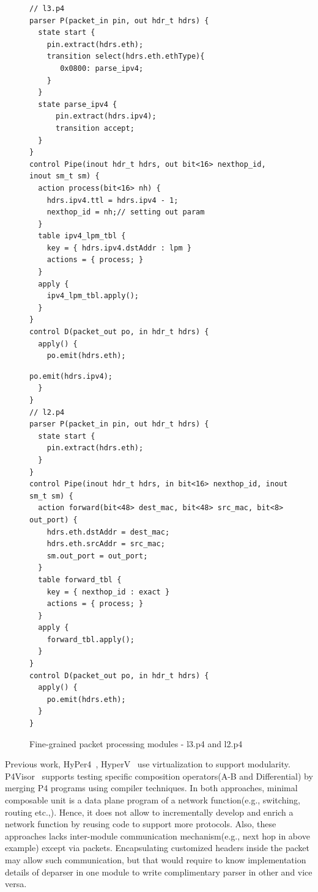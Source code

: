 \documentclass[10pt,sigconf,letterpaper,anonymous]{acmart}
\begin{document}
\begin{figure}
\noindent \begin{minipage}[t]{.48\textwidth}
\begin{lstlisting}[frame=none]
// l3.p4
parser P(packet_in pin, out hdr_t hdrs) {
  state start {
    pin.extract(hdrs.eth);
    transition select(hdrs.eth.ethType){
       0x0800: parse_ipv4;
    }
  }
  state parse_ipv4 {
      pin.extract(hdrs.ipv4);
      transition accept;
  }
}
control Pipe(inout hdr_t hdrs, out bit<16> nexthop_id, inout sm_t sm) {
  action process(bit<16> nh) {
    hdrs.ipv4.ttl = hdrs.ipv4 - 1;
    nexthop_id = nh;// setting out param
  }
  table ipv4_lpm_tbl {
    key = { hdrs.ipv4.dstAddr : lpm } 
    actions = { process; }
  }
  apply {
    ipv4_lpm_tbl.apply();
  }
}
control D(packet_out po, in hdr_t hdrs) {
  apply() {
    po.emit(hdrs.eth);
\end{lstlisting}
\end{minipage}
\hfill\begin{minipage}[t]{.48\textwidth}
\begin{lstlisting}[frame=none]
    po.emit(hdrs.ipv4);
  }
}
// l2.p4
parser P(packet_in pin, out hdr_t hdrs) {
  state start {
    pin.extract(hdrs.eth);
  }
}
control Pipe(inout hdr_t hdrs, in bit<16> nexthop_id, inout sm_t sm) {
  action forward(bit<48> dest_mac, bit<48> src_mac, bit<8> out_port) {
    hdrs.eth.dstAddr = dest_mac;
    hdrs.eth.srcAddr = src_mac;
    sm.out_port = out_port;    
  }
  table forward_tbl {
    key = { nexthop_id : exact } 
    actions = { process; }
  }
  apply {
    forward_tbl.apply();
  }
}
control D(packet_out po, in hdr_t hdrs) {
  apply() {
    po.emit(hdrs.eth);
  }
}
\end{lstlisting}
\end{minipage}
\vspace*{-10pt}
\caption{Fine-grained packet processing modules - l3.p4  and l2.p4}
\label{fig:l3.p4.l2.p4}
\end{figure}


Previous work, HyPer4~\cite{Hancock:2016:HUP:2999572.2999607}, HyperV~\cite{8038396} use virtualization to support modularity.
P4Visor~\cite{Zheng:2018:PLV:3281411.3281436} supports testing specific composition operators(A-B and Differential) by merging P4 programs using compiler techniques.
In both approaches, minimal composable unit is a data plane program of a network function(e.g., switching, routing etc.,). 
Hence, it does not allow to incrementally develop and enrich a network function by reusing code to support more protocols.
Also, these approaches lacks inter-module communication mechanism(e.g., next hop in above example) except via packets.
Encapsulating customized headers inside the packet may allow such communication, but that would require to know
implementation details of deparser in one module to write complimentary parser in other and vice versa. 
\end{document}
